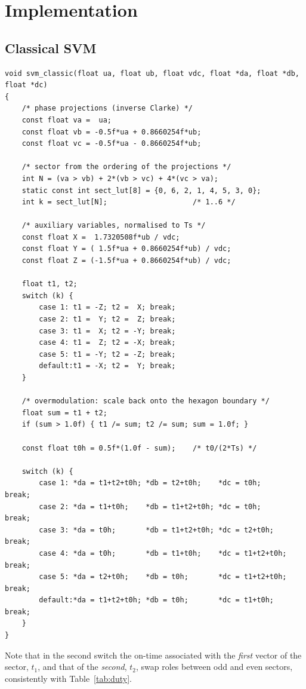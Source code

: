 \documentclass[11pt,a4paper]{article}
\begin{document}
\section{Implementation}

\subsection{Classical SVM}

\begin{lstlisting}[caption={Sector-based SVM.}]
void svm_classic(float ua, float ub, float vdc, float *da, float *db, float *dc)
{
    /* phase projections (inverse Clarke) */
    const float va =  ua;
    const float vb = -0.5f*ua + 0.8660254f*ub;
    const float vc = -0.5f*ua - 0.8660254f*ub;

    /* sector from the ordering of the projections */
    int N = (va > vb) + 2*(vb > vc) + 4*(vc > va);
    static const int sect_lut[8] = {0, 6, 2, 1, 4, 5, 3, 0};
    int k = sect_lut[N];                    /* 1..6 */

    /* auxiliary variables, normalised to Ts */
    const float X =  1.7320508f*ub / vdc;
    const float Y = ( 1.5f*ua + 0.8660254f*ub) / vdc;
    const float Z = (-1.5f*ua + 0.8660254f*ub) / vdc;

    float t1, t2;
    switch (k) {
        case 1: t1 = -Z; t2 =  X; break;
        case 2: t1 =  Y; t2 =  Z; break;
        case 3: t1 =  X; t2 = -Y; break;
        case 4: t1 =  Z; t2 = -X; break;
        case 5: t1 = -Y; t2 = -Z; break;
        default:t1 = -X; t2 =  Y; break;
    }

    /* overmodulation: scale back onto the hexagon boundary */
    float sum = t1 + t2;
    if (sum > 1.0f) { t1 /= sum; t2 /= sum; sum = 1.0f; }

    const float t0h = 0.5f*(1.0f - sum);    /* t0/(2*Ts) */

    switch (k) {
        case 1: *da = t1+t2+t0h; *db = t2+t0h;    *dc = t0h;       break;
        case 2: *da = t1+t0h;    *db = t1+t2+t0h; *dc = t0h;       break;
        case 3: *da = t0h;       *db = t1+t2+t0h; *dc = t2+t0h;    break;
        case 4: *da = t0h;       *db = t1+t0h;    *dc = t1+t2+t0h; break;
        case 5: *da = t2+t0h;    *db = t0h;       *dc = t1+t2+t0h; break;
        default:*da = t1+t2+t0h; *db = t0h;       *dc = t1+t0h;    break;
    }
}
\end{lstlisting}

\noindent
Note that in the second switch the on-time associated with the \emph{first} vector of
the sector, $t_1$, and that of the \emph{second}, $t_2$, swap roles between odd and
even sectors, consistently with Table~\ref{tab:duty}.
\end{document}
